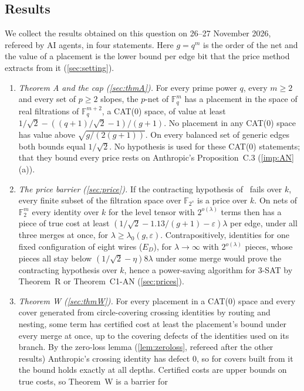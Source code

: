 \documentclass[10pt]{amsart}
\theoremstyle{plain}
\theoremstyle{definition}
\theoremstyle{remark}
\numberwithin{equation}{section}
\newcommand{\F}{\mathbb{F}}
\newcommand{\eps}{\varepsilon}
\begin{document}
\subsection{Results}
We collect the results obtained on this question on 26--27 November 2026, refereed by AI agents,
in four statements. Here $g=q^m$ is the order of the net and the value of a placement
is the lower bound per edge bit that the price method extracts from it (\cref{sec:setting}).

\begin{enumerate}[label=(\arabic*)]
\item \emph{Theorem A and the cap (\cref{sec:thmA}).} For every prime power $q$, every $m\ge2$ and
every set of $p\ge2$ slopes, the $p$-net of $\F_q^m$ has a placement in the space of real
filtrations of $\F_q^{m+2}$, a CAT(0) space, of value at least
$1/\sqrt2-((q+1)/\sqrt2-1)/(g+1)$. No placement in any CAT(0) space has value above
$\sqrt{g/(2(g+1))}$. On every balanced set of generic edges both bounds equal $1/\sqrt2$. No
hypothesis is used for these CAT(0) statements; that they bound every price rests on Anthropic's
Proposition~C.3 (\cref{imp:AN}(a)).
\item \emph{The price barrier (\cref{sec:price}).} If the contracting hypothesis of~\cite{AnthropicVP}
fails over $k$, every finite subset of the filtration space over $\F_{2^s}$ is a price over $k$. On
nets of $\F_2^m$ every identity over $k$ for the level tensor with $2^{o(\lambda)}$ terms then has a
piece of true cost at least $(1/\sqrt2-1.13/(g+1)-\eps)\lambda$ per edge, under all three merges at
once, for $\lambda\ge\lambda_0(g,\eps)$. Contrapositively, identities for one fixed configuration of
eight wires ($E_D$), for $\lambda\to\infty$ with $2^{o(\lambda)}$ pieces, whose pieces all stay below
$(1/\sqrt2-\eta)8\lambda$ under some merge would prove the contracting hypothesis over $k$, hence a
power-saving algorithm for 3-SAT by Theorem~R or Theorem~C1-AN (\cref{sec:prices}).
\item \emph{Theorem W (\cref{sec:thmW}).} For every placement in a CAT(0) space and every cover
generated from circle-covering crossing identities by routing and nesting, some term has certified
cost at least the placement's bound under every merge at once, up to the covering defects of the
identities used on its branch. By the zero-loss lemma (\cref{lem:zeroloss}, refereed after the other
results) Anthropic's crossing identity has defect $0$, so for covers built from it the bound holds
exactly at all depths. Certified costs are upper bounds on true costs, so Theorem~W is a barrier for

\end{enumerate}
\end{document}
